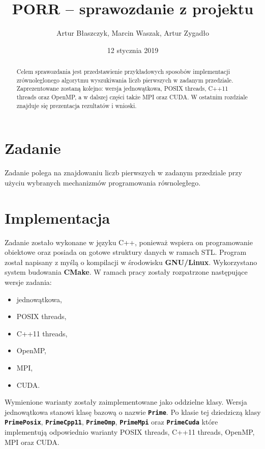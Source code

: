 \documentclass[12pt, twoside, hidelinks, a4paper]{article}
\begin{document}

\author{Artur Błaszczyk, Marcin Waszak, Artur Zygadło}
\title{PORR -- sprawozdanie z projektu}
\date{12 stycznia 2019}


\maketitle

\begin{abstract}
Celem sprawozdania jest przedstawienie przykładowych sposobów implementacji zrównoleglonego algorytmu wyszukiwania liczb pierwszych w zadanym przedziale. Zaprezentowane zostaną kolejno: wersja jednowątkowa, POSIX threads, C++11 threads oraz OpenMP, a w dalszej części także MPI oraz CUDA. W ostatnim rozdziale znajduje się prezentacja rezultatów i wnioski. 
\end{abstract}

\section{Zadanie}
Zadanie polega na znajdowaniu liczb pierwszych w zadanym przedziale przy użyciu wybranych mechanizmów programowania równoległego.

\section{Implementacja}
Zadanie zostało wykonane w języku C++, ponieważ wspiera on programowanie obiektowe oraz posiada on gotowe struktury danych w ramach STL. Program został napisany z myślą o kompilacji w środowisku \textbf{GNU/Linux}. Wykorzystano system budowania \textbf{CMake}. W ramach pracy zostały rozpatrzone następujące wersje zadania:

\begin{multicols}{2}
\begin{itemize}
\item jednowątkowa,
\item POSIX threads,
\item C++11 threads,
\item OpenMP,
\item MPI,
\item CUDA.
\end{itemize}
\end{multicols}

Wymienione warianty zostały zaimplementowane jako oddzielne klasy. Wersja jednowątkowa stanowi klasę bazową o nazwie \textbf{\texttt{Prime}}. Po klasie tej dziedziczą klasy \textbf{\texttt{PrimePosix}}, \textbf{\texttt{PrimeCpp11}}, \textbf{\texttt{PrimeOmp}}, \textbf{\texttt{PrimeMpi}} oraz \textbf{\texttt{PrimeCuda}} które implementują odpowiednio warianty POSIX threads, C++11 threads, OpenMP, MPI oraz CUDA.
\end{document}
